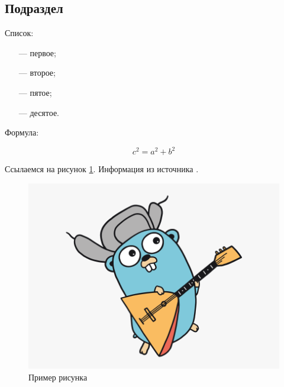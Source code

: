 \subsection{Подраздел}

Список:

\begin{itemize}[leftmargin=1.6\parindent]
	\item[---] первое;
	\item[---] второе;
	\item[---] пятое;
	\item[---] десятое.
\end{itemize}

Формула:

\begin{equation}
c^2 = a^2 + b^2
\end{equation}

Ссылаемся на рисунок \ref{fig:a1}. Информация из источника \cite{MSD}.

\begin{figure}[hbtp]
	\centering
	\includegraphics[width=\textwidth]{img/golang.png}
	\caption{Пример рисунка}
	\label{fig:a1}
\end{figure}


\pagebreak